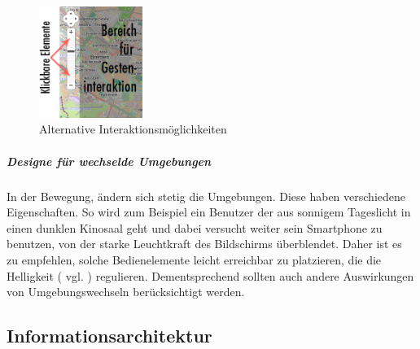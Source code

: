 \begin{figure}
	\begin{center}
	
	\includegraphics[width=0.3\textwidth]{img/NUIbsp.png}
	\caption{Alternative Interaktionsmöglichkeiten}\label{fig:nuibsp}
\end{center}
\end{figure}

\subparagraph{Designe für wechselde Umgebungen} %
\label{subp:designe_f_r_au_eneinsatz}

In der Bewegung, ändern sich stetig die Umgebungen. Diese haben verschiedene Eigenschaften. So wird zum Beispiel ein Benutzer der aus sonnigem Tageslicht in einen dunklen Kinosaal geht und dabei versucht weiter sein Smartphone zu benutzen, von der starke Leuchtkraft des Bildschirms überblendet. Daher ist es zu empfehlen, solche Bedienelemente leicht erreichbar zu platzieren, die die Helligkeit ( vgl. \cite[ff Seite 418]{mobileInteraces}) regulieren. Dementsprechend sollten auch andere Auswirkungen von Umgebungswechseln berücksichtigt werden.
\newline


\subsection{Informationsarchitektur}
\label{sec:Informationsaufbereitung}

